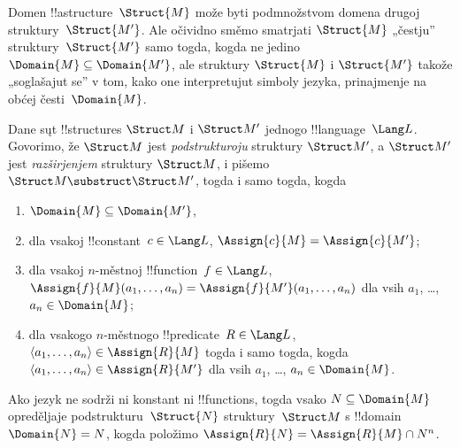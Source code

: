 \documentclass[../../../include/open-logic-section]{subfiles}
\begin{document}

Domen !!a{structure}~$\Struct{M}$ može byti podmnožstvom domena
drugoj struktury~$\Struct{M'}$. Ale očividno směmo smatrjati
$\Struct{M}$ „čestju” struktury~$\Struct{M'}$ samo togda, kogda ne
jedino $\Domain{M} \subseteq \Domain{M'}$, ale struktury $\Struct{M}$
i $\Struct{M'}$ takože „soglašajut se” v tom, kako one interpretujut
simboly jezyka, prinajmenje na obćej česti~$\Domain{M}$.

\begin{defn}
Dane sųt !!{structure}s $\Struct M$ i $\Struct M'$ jednogo
!!{language}~$\Lang L$. Govorimo, že $\Struct M$ jest
\emph{podstrukturoju} struktury $\Struct M'$, a $\Struct M'$ jest
\emph{razširjenjem} struktury $\Struct M$, i pišemo $\Struct M
\substruct \Struct M'$, togda i samo togda, kogda
\begin{enumerate}
\item $\Domain{M} \subseteq \Domain{M'}$,
\item dla vsakoj !!{constant}~$c \in \Lang L$, $\Assign{c}{M} =
    \Assign{c}{M'}$;
\item dla vsakoj $n$-městnoj !!{function}~$f \in \Lang L$,
  $\Assign{f}{M}(a_1, \dots, a_n) = \Assign{f}{M'}(a_1, \dots, a_n)$
  dla vsih $a_1$, \dots, $a_n \in \Domain{M}$;
\item dla vsakogo $n$-městnogo !!{predicate}~$R \in \Lang L$,
  $\langle a_1, \dots, a_n\rangle \in \Assign{R}{M}$ togda i samo
  togda, kogda $\langle a_1, \dots, a_n\rangle \in \Assign{R}{M'}$
  dla vsih $a_1$, \dots, $a_n \in \Domain{M}$.
\end{enumerate}
\end{defn}

\begin{rem}
Ako jezyk ne sodrži ni konstant ni !!{function}s, togda vsako $N
\subseteq \Domain{M}$ opreděljaje podstrukturu~$\Struct{N}$
struktury~$\Struct M$ s !!{domain}~$\Domain{N} = N$, kogda položimo
$\Assign{R}{N} = \Assign{R}{M} \cap N^n$.
\end{rem}

\end{document}
